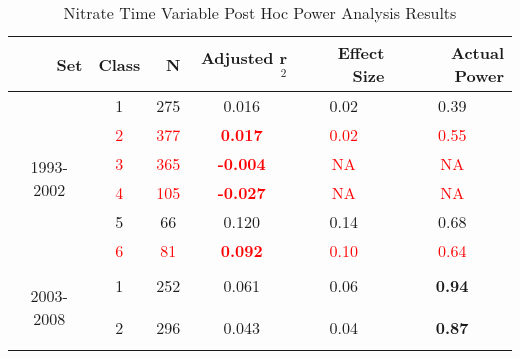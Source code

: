 \begin{table}\tiny
  \centering
  \caption{Nitrate Time Variable Post Hoc Power Analysis Results}
    \begin{tabular}{rrrrrr}
    \toprule
    Set   & Class & N     & Adjusted r$^2$ & \multicolumn{1}{p{.5cm}}{Effect Size} & Actual Power \\
    \midrule
    \multicolumn{1}{c}{\multirow{6}[1]{*}{\begin{sideways}1993-2002\end{sideways}}} & \multicolumn{1}{c}{1} & \multicolumn{1}{c}{275} & \multicolumn{1}{c}{0.016 } & \multicolumn{1}{c}{0.02 } & \multicolumn{1}{c}{0.39 } \\
    \multicolumn{1}{c}{} & \multicolumn{1}{c}{\textcolor{red}{2}} & \multicolumn{1}{c}{\textcolor{red}{377}} & \multicolumn{1}{c}{\textcolor{red}{\textbf{0.017 }}} & \multicolumn{1}{c}{\textcolor{red}{0.02}} & \multicolumn{1}{c}{\textcolor{red}{0.55}} \\
    \multicolumn{1}{c}{} & \multicolumn{1}{c}{\textcolor{red}{3}} & \multicolumn{1}{c}{\textcolor{red}{365}} & \multicolumn{1}{c}{\textcolor{red}{\textbf{-0.004}}} & \multicolumn{1}{c}{\textcolor{red}{NA}} & \multicolumn{1}{c}{\textcolor{red}{NA}} \\
    \multicolumn{1}{c}{} & \multicolumn{1}{c}{\textcolor{red}{4}} & \multicolumn{1}{c}{\textcolor{red}{105}} & \multicolumn{1}{c}{\textbf{\textcolor{red}{-0.027}}} & \multicolumn{1}{c}{\textcolor{red}{NA}} & \multicolumn{1}{c}{\textcolor{red}{NA}} \\
    \multicolumn{1}{c}{} & \multicolumn{1}{c}{5} & \multicolumn{1}{c}{66} & \multicolumn{1}{c}{0.120 } & \multicolumn{1}{c}{0.14 } & \multicolumn{1}{c}{0.68 } \\
    \multicolumn{1}{c}{} & \multicolumn{1}{c}{\textcolor{red}{6}} & \multicolumn{1}{c}{\textcolor{red}{81}} & \multicolumn{1}{c}{\textcolor{red}{\textbf{0.092 }}} & \multicolumn{1}{c}{\textcolor{red}{0.10}} & \multicolumn{1}{c}{\textcolor{red}{0.64}} \\\midrule
    \multicolumn{1}{c}{\multirow{6}[2]{*}{\begin{sideways}2003-2008\end{sideways}}} & \multicolumn{1}{c}{1} & \multicolumn{1}{c}{252} & \multicolumn{1}{c}{0.061 } & \multicolumn{1}{c}{0.06 } & \multicolumn{1}{c}{\textbf{0.94}} \\
    \multicolumn{1}{c}{} & \multicolumn{1}{c}{2} & \multicolumn{1}{c}{296} & \multicolumn{1}{c}{0.043 } & \multicolumn{1}{c}{0.04 } & \multicolumn{1}{c}{\textbf{0.87}} \\

\end{tabular}
\end{table}

